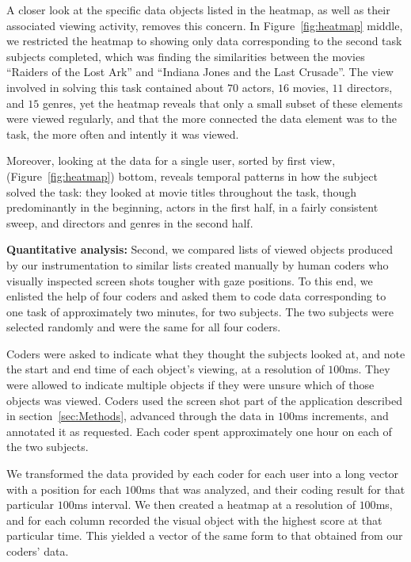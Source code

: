 A closer look at the specific data objects listed in the heatmap, as well as their associated viewing activity, removes this concern. In Figure~\ref{fig:heatmap} middle, we restricted the heatmap to showing only data corresponding to the second task subjects completed, which was finding the similarities between the movies ``Raiders of the Lost Ark'' and ``Indiana Jones and the Last Crusade''. The view involved in solving this task contained about $70$ actors, $16$ movies, $11$ directors, and $15$ genres, yet the heatmap reveals that only a small subset of these elements were viewed regularly, and that the more connected the data element was to the task, the more often and intently it was viewed.

Moreover, looking at the data for a single user, sorted by first view, (Figure~\ref{fig:heatmap}) bottom, reveals temporal patterns in how the subject solved the task: they looked at movie titles throughout the task, though predominantly in the beginning, actors in the first half, in a fairly consistent sweep, and directors and genres in the second half. 

\textbf{Quantitative analysis:} Second, we compared lists of viewed objects produced by our instrumentation to similar lists created manually by human coders who visually inspected screen shots tougher with gaze positions. To this end, we enlisted the help of four coders and asked them to code data corresponding to one task of approximately two minutes, for two subjects. The two subjects were selected randomly and were the same for all four coders. 

Coders were asked to indicate what they thought the subjects looked at, and note the start and end time of each object's viewing, at a resolution of $100$ms. They were allowed to indicate multiple objects if they were unsure which of those objects was viewed. Coders used the screen shot part of the application described in section~\ref{sec:Methods}, advanced through the data in $100$ms increments, and annotated it as requested. Each coder spent approximately one hour on each of the two subjects.

We transformed the data provided by each coder for each user into a long vector with a position for each $100$ms that was analyzed, and their coding result for that particular $100$ms interval. We then created a heatmap at a resolution of $100$ms, and for each column recorded the visual object with the highest score at that particular time. This yielded a vector of the same form to that obtained from our coders' data.  

